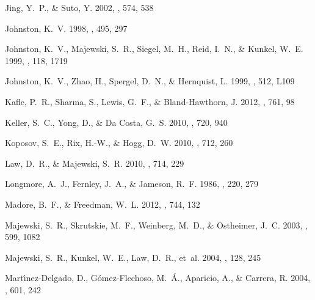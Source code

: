 \documentclass{emulateapj}
\begin{document}
\begin{thebibliography}{47}
{Jing}, Y.~P., \& {Suto}, Y. 2002, \apj, 574, 538

{Johnston}, K.~V. 1998, \apj, 495, 297

{Johnston}, K.~V., {Majewski}, S.~R., {Siegel}, M.~H., {Reid}, I.~N., \&
  {Kunkel}, W.~E. 1999{}, \aj, 118, 1719

{Johnston}, K.~V., {Zhao}, H., {Spergel}, D.~N., \& {Hernquist}, L.
  1999{}, \apjl, 512, L109

{Kafle}, P.~R., {Sharma}, S., {Lewis}, G.~F., \& {Bland-Hawthorn}, J. 2012,
  \apj, 761, 98

{Keller}, S.~C., {Yong}, D., \& {Da Costa}, G.~S. 2010, \apj, 720, 940

{Koposov}, S.~E., {Rix}, H.-W., \& {Hogg}, D.~W. 2010, \apj, 712, 260

{Law}, D.~R., \& {Majewski}, S.~R. 2010, \apj, 714, 229

{Longmore}, A.~J., {Fernley}, J.~A., \& {Jameson}, R.~F. 1986, \mnras, 220, 279

{Madore}, B.~F., \& {Freedman}, W.~L. 2012, \apj, 744, 132

{Majewski}, S.~R., {Skrutskie}, M.~F., {Weinberg}, M.~D., \& {Ostheimer}, J.~C.
  2003, \apj, 599, 1082

{Majewski}, S.~R., {Kunkel}, W.~E., {Law}, D.~R., {et~al.} 2004, \aj, 128, 245

{Mart{\'{\i}}nez-Delgado}, D., {G{\'o}mez-Flechoso}, M.~{\'A}., {Aparicio}, A.,
  \& {Carrera}, R. 2004, \apj, 601, 242


\end{thebibliography}
\end{document}
